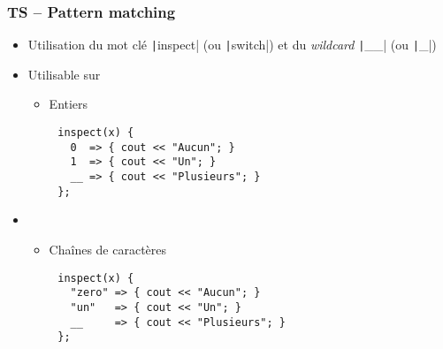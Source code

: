 \documentclass[C++.tex]{subfiles}
\begin{document}
\begin{frame}[fragile]
	\frametitle{TS -- Pattern matching}
	\begin{itemize}
		\item Utilisation du mot clé \texttt|inspect| (ou \texttt|switch|) et du \textit{wildcard} \texttt|__| (ou \texttt|_|)
		\item Utilisable sur
		\begin{itemize}
			\item Entiers
		\end{itemize}
	\end{itemize}

	\begin{verbatim}
		inspect(x) {
		  0  => { cout << "Aucun"; }
		  1  => { cout << "Un"; }
		  __ => { cout << "Plusieurs"; }
		};
	\end{verbatim}

	\begin{itemize}
		\item[]
		\begin{itemize}
			\item Chaînes de caractères
		\end{itemize}
	\end{itemize}

	\begin{verbatim}
		inspect(x) {
		  "zero" => { cout << "Aucun"; }
		  "un"   => { cout << "Un"; }
		  __     => { cout << "Plusieurs"; }
		};
	\end{verbatim}



\end{frame}
\end{document}

